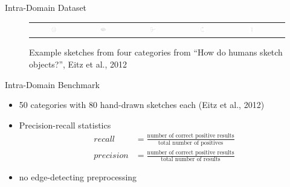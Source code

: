 \documentclass[mathserif]{beamer}
\begin{document}
\begin{frame}{Intra-Domain Dataset}
\begin{figure}
\begin{tabular}{cccccc}
            \includegraphics[width=0.15\textwidth]{illustrations/sketch_examples/donut_2.png} &
            \includegraphics[width=0.15\textwidth]{illustrations/sketch_examples/donut_3.png} &
            \includegraphics[width=0.15\textwidth]{illustrations/sketch_examples/doorhandle_1.png} &
            \includegraphics[width=0.15\textwidth]{illustrations/sketch_examples/doorhandle_2.png} &
            \includegraphics[width=0.15\textwidth]{illustrations/sketch_examples/doorhandle_3.png}
        \end{tabular}
        \caption{Example sketches from four categories from ``How do humans
            sketch objects?'', Eitz et al., 2012}
    \end{figure}
\end{frame}

\begin{frame}{Intra-Domain Benchmark}
    \begin{itemize}
        \item 50 categories with 80 hand-drawn sketches each (Eitz et al., 2012)
        \item Precision-recall statistics
            \begin{align*}
                recall & = \frac{\text{number of correct positive results}}{\text{total number of positives}} \\
                precision & = \frac{\text{number of correct positive results}}{\text{total number of results}}
            \end{align*}
        \item no edge-detecting preprocessing
    \end{itemize}
\end{frame}
\end{document}
